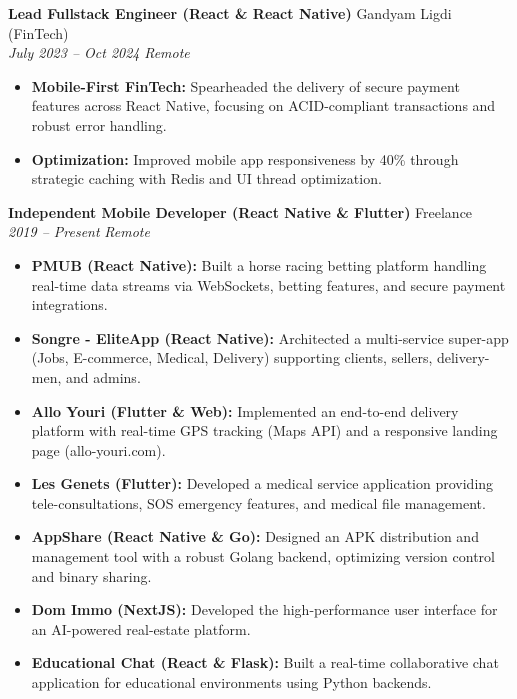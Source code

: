 \documentclass[a4paper,10pt]{article}
\newcommand{\jobheader}[4]{%
    \textbf{#1} \hfill #2 \\
    \textit{#3} \hfill \textit{#4}
    \vspace{0.05cm}
}
\begin{document}
\vspace{0.15cm}

\jobheader{Lead Fullstack Engineer (React \& React Native)}{Gandyam Ligdi (FinTech)}{July 2023 -- Oct 2024}{Remote}
\begin{itemize}[leftmargin=*,nosep]
    \item \textbf{Mobile-First FinTech:} Spearheaded the delivery of secure payment features across React Native, focusing on ACID-compliant transactions and robust error handling.
    \item \textbf{Optimization:} Improved mobile app responsiveness by 40\% through strategic caching with Redis and UI thread optimization.
\end{itemize}

\vspace{0.15cm}

\jobheader{Independent Mobile Developer (React Native \& Flutter)}{Freelance}{2019 -- Present}{Remote}
\begin{itemize}[leftmargin=*,nosep]
    \item \textbf{PMUB (React Native):} Built a horse racing betting platform handling real-time data streams via WebSockets, betting features, and secure payment integrations.
    \item \textbf{Songre - EliteApp (React Native):} Architected a multi-service super-app (Jobs, E-commerce, Medical, Delivery) supporting clients, sellers, delivery-men, and admins.
    \item \textbf{Allo Youri (Flutter \& Web):} Implemented an end-to-end delivery platform with real-time GPS tracking (Maps API) and a responsive landing page (allo-youri.com).
    \item \textbf{Les Genets (Flutter):} Developed a medical service application providing tele-consultations, SOS emergency features, and medical file management.
    \item \textbf{AppShare (React Native \& Go):} Designed an APK distribution and management tool with a robust Golang backend, optimizing version control and binary sharing.
    \item \textbf{Dom Immo (NextJS):} Developed the high-performance user interface for an AI-powered real-estate platform.
    \item \textbf{Educational Chat (React \& Flask):} Built a real-time collaborative chat application for educational environments using Python backends.
\end{itemize}

\vspace{0.15cm}
\end{document}
